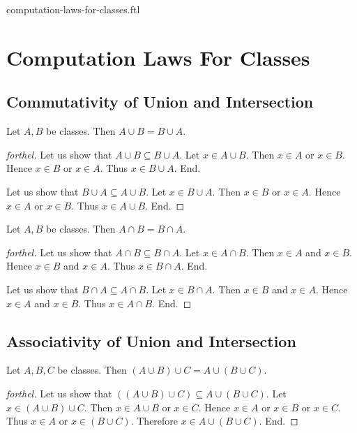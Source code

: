 \documentclass{naproche-library}
\begin{document}
\begin{smodule}{computation-laws-for-classes.ftl}

  \section*{Computation Laws For Classes}

  \subsection*{Commutativity of Union and Intersection}

  \begin{proposition}[forthel,id=FOUNDATIONS_02_8446177632583680]
    Let $A, B$ be classes.
    Then $A \cup B = B \cup A$.
  \end{proposition}
  \begin{proof}[forthel]
    Let us show that $A \cup B \subseteq B \cup A$.
      Let $x \in A \cup B$.
      Then $x \in A$ or $x \in B$.
      Hence $x \in B$ or $x \in A$.
      Thus $x \in B \cup A$.
    End.

    Let us show that $B \cup A \subseteq A \cup B$.
      Let $x \in B \cup A$.
      Then $x \in B$ or $x \in A$.
      Hence $x \in A$ or $x \in B$.
      Thus $x \in A \cup B$.
    End.
  \end{proof}

  \begin{proposition}[forthel,id=FOUNDATIONS_02_7565102251245568]
    Let $A, B$ be classes.
    Then $A \cap B = B \cap A$.
  \end{proposition}
  \begin{proof}[forthel]
    Let us show that $A \cap B \subseteq B \cap A$.
      Let $x \in A \cap B$.
      Then $x \in A$ and $x \in B$.
      Hence $x \in B$ and $x \in A$.
      Thus $x \in B \cap A$.
    End.

    Let us show that $B \cap A \subseteq A \cap B$.
      Let $x \in B \cap A$.
      Then $x \in B$ and $x \in A$.
      Hence $x \in A$ and $x \in B$.
      Thus $x \in A \cap B$.
    End.
  \end{proof}


  \subsection*{Associativity of Union and Intersection}

  \begin{proposition}[forthel,id=FOUNDATIONS_02_3854032263184384]
    Let $A, B, C$ be classes.
    Then $(A \cup B) \cup C = A \cup (B \cup C)$.
  \end{proposition}
  \begin{proof}[forthel]
    Let us show that $((A \cup B) \cup C) \subseteq A \cup (B \cup C)$. %
      Let $x \in (A \cup B) \cup C$.
      Then $x \in A \cup B$ or $x \in C$.
      Hence $x \in A$ or $x \in B$ or $x \in C$.
      Thus $x \in A$ or $x \in (B \cup C)$.
      Therefore $x \in A \cup (B \cup C)$.
    End.


\end{proof}
\end{smodule}
\end{document}
